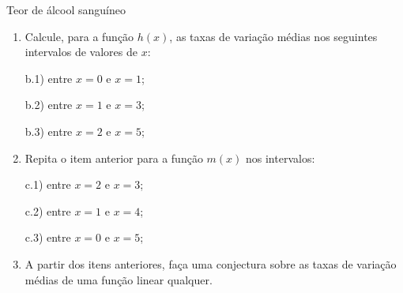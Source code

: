 \begin{task}{Teor de álcool sanguíneo}
\begin{enumerate}
\item {} 
Calcule, para a função \(h(x)\), as taxas de variação médias nos seguintes intervalos de valores de \(x\):

b.1) entre \(x=0\) e \(x=1\);

b.2) entre \(x=1\) e \(x=3\);

b.3) entre \(x=2\) e \(x=5\);

\item {} 
Repita o item anterior para a função \(m(x)\) nos intervalos:

c.1) entre \(x=2\) e \(x=3\);

c.2) entre \(x=1\) e \(x=4\);

c.3) entre \(x=0\) e \(x=5\);

\item {} 
A partir dos itens anteriores, faça uma conjectura sobre as taxas de variação médias de uma função linear qualquer.

\end{enumerate}
\end{task}


